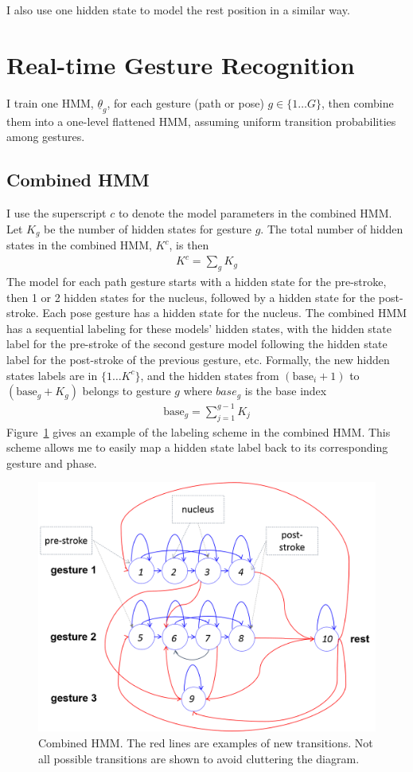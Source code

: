 I also use one hidden state to model the rest position in a similar way.

\section{Real-time Gesture Recognition}
I train one HMM, $\underline{\theta}_g$, for each gesture (path or pose) $g\in
\{1\ldots G\}$, then combine them into a one-level flattened HMM, assuming uniform transition probabilities among gestures.

\subsection{Combined HMM}
I use the superscript $c$ to denote the model
parameters in the combined HMM. Let $K_{g}$ be the number of hidden states for
gesture $g$. The total number of hidden states in the combined HMM, $K^c$, is then
\begin{align*}
K^c = \sum_g K_{g}
\end{align*}
The model for each path gesture starts with a hidden state for the pre-stroke,
then 1 or 2 hidden states for the nucleus, followed by a hidden state for the
post-stroke. Each pose gesture has a hidden state for the nucleus. The combined
HMM has a sequential labeling for these models' hidden states, with the hidden state label for the pre-stroke of the second gesture model following
the hidden state label for the post-stroke of the previous gesture, etc.
Formally, the new hidden states labels are in $\{1\ldots K^c\}$, and
the hidden states from $(\text{base}_i + 1)$ to $(\text{base}_g + K_{g})$
belongs to gesture $g$ where $base_g$ is the base index
\begin{align*}
\text{base}_g = \sum_{j=1}^{g-1}K_{j}
\end{align*}
Figure~\ref{fig:combined-hmm} gives an example of the labeling scheme in
the combined HMM. This scheme allows me to easily map a hidden state label back
to its corresponding gesture and phase.

\begin{figure}[tbh]
\centering
\includegraphics[width=0.9\columnwidth]{figures/combined_hmm.png}
\caption{Combined HMM. The red lines are examples of new transitions. Not all
possible transitions are shown to avoid cluttering the diagram.}
\label{fig:combined-hmm}
\end{figure}


